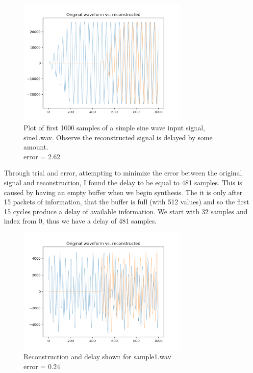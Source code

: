 \documentclass[11pt,a4paper]{article}
\begin{document}
\begin{figure}[ht]
	\centering
	\includegraphics[width=0.75\textwidth]{synthesis/sine1_delay}
	\caption{Plot of first 1000 samples of a simple sine wave input signal, sine1.wav. Observe the reconstructed signal is delayed by some amount. \\ error = 2.62}
	\label{fig:delay}
\end{figure}

Through trial and error, attempting to minimize the error between the original signal and reconstruction, I found the delay to be equal to 481 samples. This is caused by having an empty buffer when we begin synthesis. The it is only after 15 packets of information, that the buffer is full (with 512 values) and so the first 15 cycles produce a delay of available information. We start with 32 samples and index from 0, thus we have a delay of 481 samples.

\begin{figure}[ht]
	\centering
	\includegraphics[width=0.75\textwidth]{synthesis/sample1_delay}
	\caption{Reconstruction and delay shown for sample1.wav \\ error = 0.24}
	\label{fig:synthesis_sample1}
\end{figure}
\end{document}
